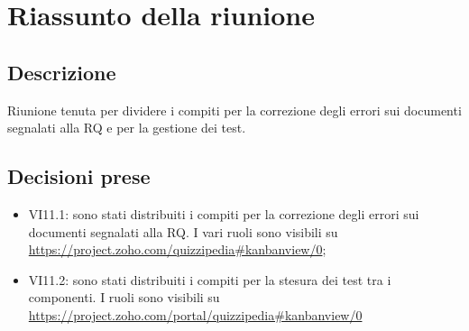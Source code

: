 \section{Riassunto della riunione}
\subsection{Descrizione}

Riunione tenuta per dividere i compiti per la correzione degli errori sui documenti segnalati alla RQ e per la gestione dei test.

\subsection{Decisioni prese}
\begin{itemize}
\item VI11.1: sono stati distribuiti i compiti per la correzione degli errori sui documenti segnalati alla RQ. I vari ruoli sono visibili su \url{https://project.zoho.com/quizzipedia#kanbanview/0};
\item VI11.2: sono stati distribuiti i compiti per la stesura dei test tra i componenti. I ruoli sono visibili su \url{https://project.zoho.com/portal/quizzipedia#kanbanview/0}
\end{itemize}
